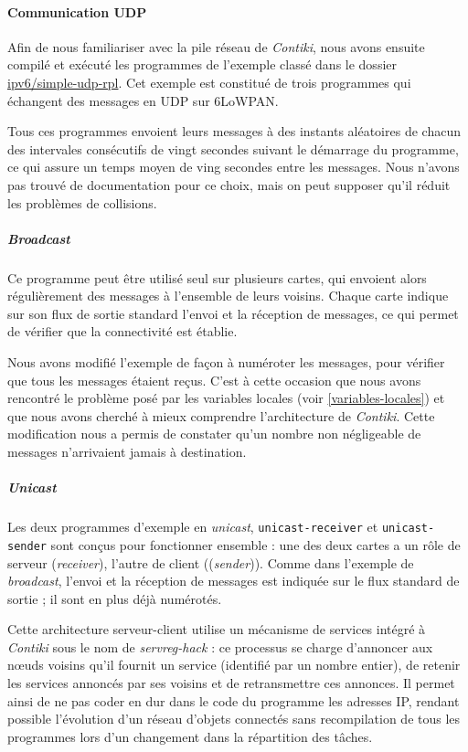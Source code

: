 \paragraph{Communication UDP}

Afin de nous familiariser avec la pile réseau de \emph{Contiki}, nous avons ensuite compilé et exécuté les programmes de l’exemple classé dans le dossier \url{ipv6/simple-udp-rpl}.
Cet exemple est constitué de trois programmes qui échangent des messages en UDP sur 6LoWPAN.

Tous ces programmes envoient leurs messages à des instants aléatoires de chacun des intervales consécutifs de vingt secondes suivant le démarrage du programme, ce qui assure un temps moyen de ving secondes entre les messages.
Nous n’avons pas trouvé de documentation pour ce choix, mais on peut supposer qu’il réduit les problèmes de collisions.

\subparagraph{\textit{Broadcast}}

Ce programme peut être utilisé seul sur plusieurs cartes, qui envoient alors régulièrement des messages à l’ensemble de leurs voisins.
Chaque carte indique sur son flux de sortie standard l’envoi et la réception de messages, ce qui permet de vérifier que la connectivité est établie.

Nous avons modifié l’exemple de façon à numéroter les messages, pour vérifier que tous les messages étaient reçus.
C’est à cette occasion que nous avons rencontré le problème posé par les variables locales (voir \cref{variables-locales}) et que nous avons cherché à mieux comprendre l’architecture de \emph{Contiki}.
Cette modification nous a permis de constater qu’un nombre non négligeable de messages n’arrivaient jamais à destination.

\subparagraph{\textit{Unicast}}

Les deux programmes d’exemple en \textit{unicast}, \texttt{unicast-receiver} et \texttt{unicast-sender} sont conçus pour fonctionner ensemble : une des deux cartes a un rôle de serveur (\textit{receiver}), l’autre de client ((\textit{sender})).
Comme dans l’exemple de \textit{broadcast}, l’envoi et la réception de messages est indiquée sur le flux standard de sortie ; il sont en plus déjà numérotés.

Cette architecture serveur-client utilise un mécanisme de services intégré à \emph{Contiki} sous le nom de \emph{servreg-hack}  : ce processus se charge d’annoncer aux nœuds voisins qu’il fournit un service (identifié par un nombre entier), de retenir les services annoncés par ses voisins et de retransmettre ces annonces.
Il permet ainsi de ne pas coder en dur dans le code du programme les adresses IP, rendant possible l’évolution d’un réseau d’objets connectés sans recompilation de tous les programmes lors d’un changement dans la répartition des tâches.

